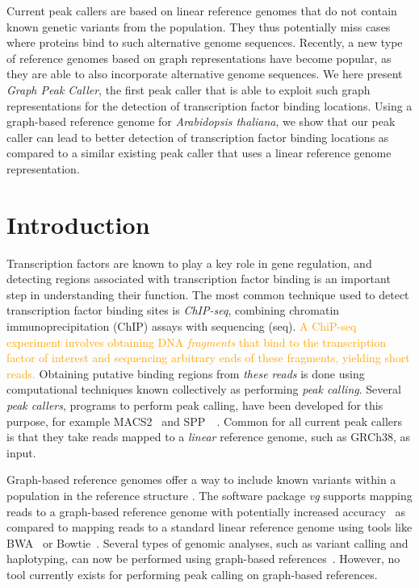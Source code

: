 \documentclass[10pt,letterpaper]{article}
\newcommand{\revision}[1]{\textcolor{orange}{#1}}
\begin{document}
Current peak callers are based on linear reference genomes that do not contain known genetic variants from the population.
They thus potentially miss cases where proteins bind to such alternative genome sequences.
Recently, a new type of reference genomes based on graph representations have become popular, as they are able to also incorporate alternative genome sequences.
We here present \emph{Graph Peak Caller}, the first peak caller that is able to exploit such graph representations for the detection of transcription factor binding locations.
Using a graph-based reference genome for \emph{Arabidopsis thaliana}, we show that our peak caller can lead to better detection of transcription factor binding locations as compared to a similar existing peak caller that uses a linear reference genome representation.

\linenumbers

\section*{Introduction}
Transcription factors are known to play a key role in gene regulation, and detecting regions associated with transcription factor binding is an important step in understanding their function. The most common technique used to detect transcription factor binding sites is \emph{ChIP-seq}, combining chromatin immunoprecipitation (ChIP) assays with sequencing (seq). \revision{A ChiP-seq experiment involves obtaining DNA \emph{fragments} that bind to the transcription factor of interest and sequencing arbitrary ends of these fragments, yielding short reads.} Obtaining putative binding regions from \emph{these reads} is done using computational techniques known collectively as performing \emph{peak calling}. Several \emph{peak callers}, programs to perform peak calling, have been developed for this purpose, for example MACS2~\cite{macs} and SPP~\cite{spp}~\cite{peak_caller_review}. Common for all current peak callers is that they take reads mapped to a \emph{linear} reference genome, such as GRCh38, as input. 

Graph-based reference genomes offer a way to include known variants within a population in the reference structure \cite{graph_evolution}. The software package \emph{vg} supports mapping reads to a graph-based reference genome with potentially increased accuracy~\cite{vg, genome_graphs} as compared to mapping reads to a standard linear reference genome using tools like BWA~\cite{bwa_mem} or Bowtie~\cite{bowtie}.
Several types of genomic analyses, such as variant calling and haplotyping, can now be performed using graph-based references~\cite{vg, genome_graphs}. However, no tool currently exists for performing peak calling on graph-based references. 
\end{document}
